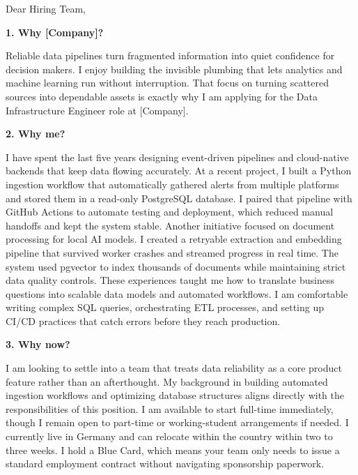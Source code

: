\documentclass[11pt,a4paper]{coverletter}
\begin{document}

\opening{Dear Hiring Team,}

\vspace{8pt}\noindent\textbf{1. Why [Company]?}\par\vspace{3pt}

Reliable data pipelines turn fragmented information into quiet confidence for decision makers. I enjoy building the invisible plumbing that lets analytics and machine learning run without interruption. That focus on turning scattered sources into dependable assets is exactly why I am applying for the Data Infrastructure Engineer role at [Company].

\vspace{8pt}\noindent\textbf{2. Why me?}\par\vspace{3pt}

I have spent the last five years designing event-driven pipelines and cloud-native backends that keep data flowing accurately. At a recent project, I built a Python ingestion workflow that automatically gathered alerts from multiple platforms and stored them in a read-only PostgreSQL database. I paired that pipeline with GitHub Actions to automate testing and deployment, which reduced manual handoffs and kept the system stable. Another initiative focused on document processing for local AI models. I created a retryable extraction and embedding pipeline that survived worker crashes and streamed progress in real time. The system used pgvector to index thousands of documents while maintaining strict data quality controls. These experiences taught me how to translate business questions into scalable data models and automated workflows. I am comfortable writing complex SQL queries, orchestrating ETL processes, and setting up CI/CD practices that catch errors before they reach production.

\vspace{8pt}\noindent\textbf{3. Why now?}\par\vspace{3pt}

I am looking to settle into a team that treats data reliability as a core product feature rather than an afterthought. My background in building automated ingestion workflows and optimizing database structures aligns directly with the responsibilities of this position. I am available to start full-time immediately, though I remain open to part-time or working-student arrangements if needed. I currently live in Germany and can relocate within the country within two to three weeks. I hold a Blue Card, which means your team only needs to issue a standard employment contract without navigating sponsorship paperwork.
\end{document}
